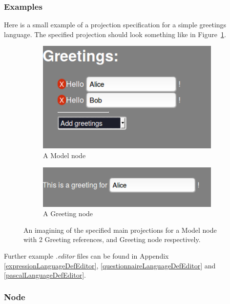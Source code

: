 \documentclass{article}
\begin{document}
{\subsubsection{Examples}
Here is a small example of a projection specification for a simple greetings language. The specified projection should look something like in Figure~\ref{fig:greetingProjection}.

\begin{figure}[t!]
  \centering
  \begin{subfigure}[b]{0.45\linewidth}
    \includegraphics[width=\linewidth]{./Screenshots/greetingsProjection1.png}
    \caption{A Model node}
  \end{subfigure}
  \begin{subfigure}[b]{0.45\linewidth}
	\includegraphics[width=\linewidth]{./Screenshots/greetingsProjection2.png}
    \caption{A Greeting node}
  \end{subfigure}
  \caption{An imagining of the specified main projections for a Model node with 2 Greeting references, and Greeting node respectively.}
  \label{fig:greetingProjection}
\end{figure}

Further example \emph{.editor} files can be found in Appendix \ref{expressionLanguageDefEditor}, \ref{questionnaireLanguageDefEditor} and \ref{pascalLanguageDefEditor}.


\subsubsection{Node}

}
\end{document}
